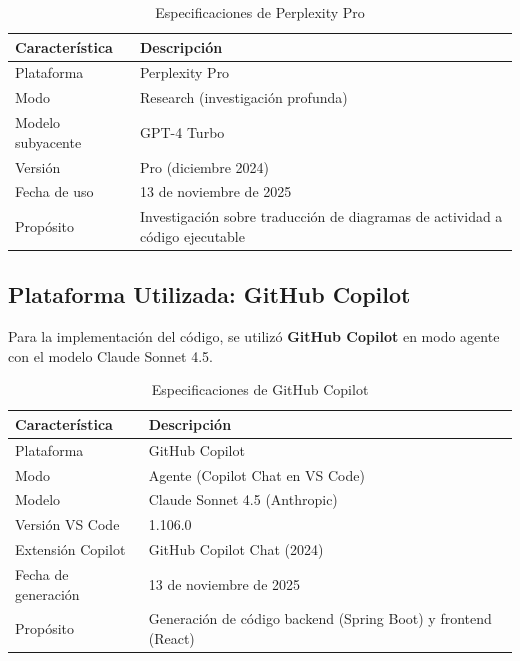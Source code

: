 \documentclass[11pt,a4paper]{article}
\begin{document}
\begin{table}[H]
\centering
\begin{tabularx}{\textwidth}{|l|X|}
\hline
\rowcolor{gray!20}
\textbf{Característica} & \textbf{Descripción} \\
\hline
Plataforma & Perplexity Pro \\
\hline
Modo & Research (investigación profunda) \\
\hline
Modelo subyacente & GPT-4 Turbo \\
\hline
Versión & Pro (diciembre 2024) \\
\hline
Fecha de uso & 13 de noviembre de 2025 \\
\hline
Propósito & Investigación sobre traducción de diagramas de actividad a código ejecutable \\
\hline
\end{tabularx}
\caption{Especificaciones de Perplexity Pro}
\end{table}


\subsection{Plataforma Utilizada: GitHub Copilot}

Para la implementación del código, se utilizó \textbf{GitHub Copilot} en modo agente con el modelo Claude Sonnet 4.5.

\begin{table}[H]
\centering
\begin{tabularx}{\textwidth}{|l|X|}
\hline
\rowcolor{gray!20}
\textbf{Característica} & \textbf{Descripción} \\
\hline
Plataforma & GitHub Copilot \\
\hline
Modo & Agente (Copilot Chat en VS Code) \\
\hline
Modelo & Claude Sonnet 4.5 (Anthropic) \\
\hline
Versión VS Code & 1.106.0 \\
\hline
Extensión Copilot & GitHub Copilot Chat (2024) \\
\hline
Fecha de generación & 13 de noviembre de 2025 \\
\hline
Propósito & Generación de código backend (Spring Boot) y frontend (React) \\
\hline
\end{tabularx}
\caption{Especificaciones de GitHub Copilot}
\end{table}
\end{document}
